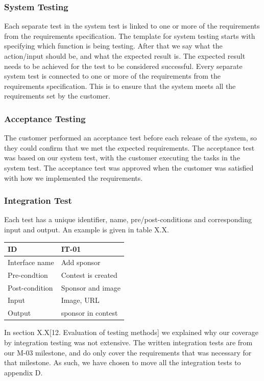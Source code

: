 \subsubsection{System Testing}
Each separate test in the system test is linked to one or more of the
requirements from the requirements specification. The template for
system testing starts with specifying which function is being testing.
After that we say what the action/input should be, and what the
expected result is. The expected result needs to be achieved for the
test to be considered successful. Every separate system test is
connected to one or more of the requirements from the requirements
specification. This is to ensure that the system meets all the
requirements set by the customer.


\subsubsection{Acceptance Testing}
The customer performed an acceptance test before each release of the
system, so they could confirm that we met the expected requirements.
The acceptance test was based on our system test, with the customer
executing the tasks in the system test. The acceptance test was
approved when the customer was satisfied with how we implemented the
requirements.

\subsubsection{Integration Test}
Each test has a unique identifier, name, pre/post-conditions and
corresponding input and output. An example is given in table X.X.


\begin{tabular}{|l|l|}
\hline
ID & IT-01\\\hline
Interface name & Add sponsor\\\hline
Pre-condtion & Contest is created\\\hline
Post-condition & Sponsor and image\\\hline
Input & Image, URL\\\hline
Output & sponsor in contest\\\hline
\end{tabular}

In section X.X[12. Evaluation of testing methods] we explained why our
coverage by integration testing was not extensive. The written
integration tests are from our M-03 milestone, and do only cover the
requirements that was necessary for that milestone. As such, we have
chosen to move all the integration tests to appendix D.

